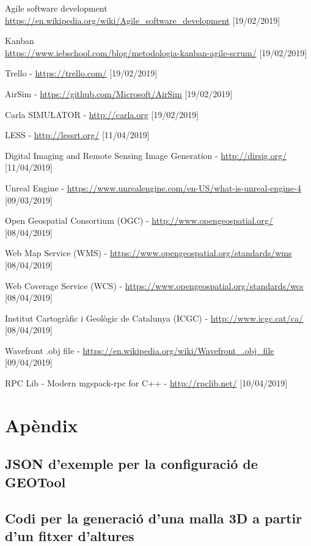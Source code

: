 \documentclass[10pt,a4paper,twocolumn,twoside]{article}
\begin{document}
\begin{thebibliography}{11}
Agile software development
\\ \url{https://en.wikipedia.org/wiki/Agile_software_development}
[19/02/2019]

Kanban
\\ \url{https://www.iebschool.com/blog/metodologia-kanban-agile-scrum/} [19/02/2019]

Trello - \url{https://trello.com/} [19/02/2019]

AirSim - \url{https://github.com/Microsoft/AirSim} [19/02/2019]

Carla SIMULATOR - \url{http://carla.org} [19/02/2019]

LESS - \url{http://lessrt.org/} [11/04/2019]

Digital Imaging and Remote Sensing Image Generation - \url{http://dirsig.org/} [11/04/2019]

Unreal Engine - \url{https://www.unrealengine.com/en-US/what-is-unreal-engine-4} [09/03/2019]

Open Geospatial Consortium (OGC) -  \url{http://www.opengeospatial.org/} [08/04/2019]

Web Map Service (WMS) -  \url{https://www.opengeospatial.org/standards/wms} [08/04/2019]

Web Coverage Service (WCS) -  \url{https://www.opengeospatial.org/standards/wcs} [08/04/2019]

Institut Cartogràfic i Geològic de Catalunya (ICGC) - \url{http://www.icgc.cat/ca/} [08/04/2019]

Wavefront .obj file - \url{https://en.wikipedia.org/wiki/Wavefront_.obj_file} [09/04/2019]

RPC Lib - Modern mgspack-rpc for C++ - \url{http://rpclib.net/} [10/04/2019]


\end{thebibliography}

\newpage
\appendix

\section*{Apèndix}

\setcounter{section}{1}

\subsection{JSON d'exemple per la configuració de GEOTool}
\label{appendix:geotoolconfig}


\subsection{Codi per la generació d'una malla 3D a partir d'un fitxer d'altures}
\label{appendix:generateobj}

\end{document}
